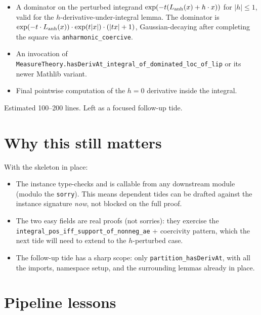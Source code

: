 \documentclass[11pt]{article}
\begin{document}
\begin{itemize}[noitemsep,leftmargin=*]
\item A dominator on the perturbed integrand
  $\exp(-t(L_{\rm anh}(x) + h \cdot x))$ for $|h| \leq 1$, valid for the
  $h$-derivative-under-integral lemma. The dominator is
  $\exp(-t \cdot L_{\rm anh}(x)) \cdot \exp(t |x|) \cdot (|t x| + 1)$,
  Gaussian-decaying after completing the square via
  \texttt{anharmonic\_coercive}.
\item An invocation of
  \texttt{MeasureTheory.hasDerivAt\_integral\_of\_dominated\_loc\_of\_lip}
  or its newer Mathlib variant.
\item Final pointwise computation of the $h = 0$ derivative inside the
  integral.
\end{itemize}

Estimated 100--200 lines. Left as a focused follow-up tide.

\section{Why this still matters}

With the skeleton in place:

\begin{itemize}[noitemsep,leftmargin=*]
\item The instance type-checks and is callable from any downstream
  module (modulo the \texttt{sorry}). This means dependent tides
  can be drafted against the instance signature \emph{now}, not
  blocked on the full proof.
\item The two easy fields are real proofs (not sorries): they
  exercise the \texttt{integral\_pos\_iff\_support\_of\_nonneg\_ae}
  + coercivity pattern, which the next tide will need to extend
  to the $h$-perturbed case.
\item The follow-up tide has a sharp scope: only
  \texttt{partition\_hasDerivAt}, with all the imports, namespace
  setup, and the surrounding lemmas already in place.
\end{itemize}

\section{Pipeline lessons}
\end{document}
